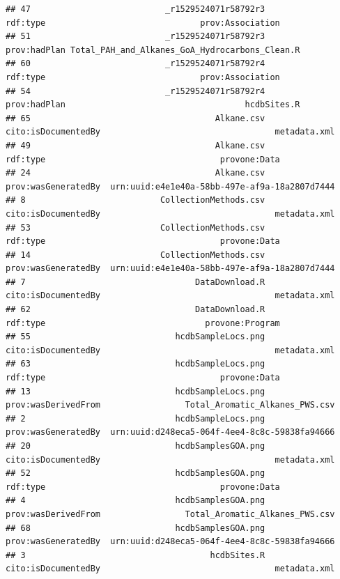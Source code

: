 \documentclass[]{article}
\begin{document}
\begin{verbatim}
## 47                           _r1529524071r58792r3                  rdf:type                               prov:Association
## 51                           _r1529524071r58792r3              prov:hadPlan Total_PAH_and_Alkanes_GoA_Hydrocarbons_Clean.R
## 60                           _r1529524071r58792r4                  rdf:type                               prov:Association
## 54                           _r1529524071r58792r4              prov:hadPlan                                    hcdbSites.R
## 65                                     Alkane.csv       cito:isDocumentedBy                                   metadata.xml
## 49                                     Alkane.csv                  rdf:type                                   provone:Data
## 24                                     Alkane.csv       prov:wasGeneratedBy  urn:uuid:e4e1e40a-58bb-497e-af9a-18a2807d7444
## 8                           CollectionMethods.csv       cito:isDocumentedBy                                   metadata.xml
## 53                          CollectionMethods.csv                  rdf:type                                   provone:Data
## 14                          CollectionMethods.csv       prov:wasGeneratedBy  urn:uuid:e4e1e40a-58bb-497e-af9a-18a2807d7444
## 7                                  DataDownload.R       cito:isDocumentedBy                                   metadata.xml
## 62                                 DataDownload.R                  rdf:type                                provone:Program
## 55                             hcdbSampleLocs.png       cito:isDocumentedBy                                   metadata.xml
## 63                             hcdbSampleLocs.png                  rdf:type                                   provone:Data
## 13                             hcdbSampleLocs.png       prov:wasDerivedFrom                 Total_Aromatic_Alkanes_PWS.csv
## 2                              hcdbSampleLocs.png       prov:wasGeneratedBy  urn:uuid:d248eca5-064f-4ee4-8c8c-59838fa94666
## 20                             hcdbSamplesGOA.png       cito:isDocumentedBy                                   metadata.xml
## 52                             hcdbSamplesGOA.png                  rdf:type                                   provone:Data
## 4                              hcdbSamplesGOA.png       prov:wasDerivedFrom                 Total_Aromatic_Alkanes_PWS.csv
## 68                             hcdbSamplesGOA.png       prov:wasGeneratedBy  urn:uuid:d248eca5-064f-4ee4-8c8c-59838fa94666
## 3                                     hcdbSites.R       cito:isDocumentedBy                                   metadata.xml

\end{verbatim}
\end{document}
